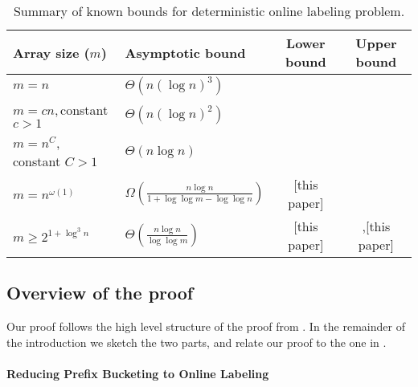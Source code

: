 \documentclass[unicode,review]{siamart1116}
\newcommand{\PTheta}[1]{\Theta\!\left(#1\right)}
\numberwithin{theorem}{section}
\begin{document}
\begin{table}
\centering
\caption{Summary of known bounds for deterministic online labeling problem.} \label{tab-1}
\begin{tabular}{l l c c}
	\toprule 
	Array size ($m$) &
	Asymptotic bound &
	Lower bound &
	Upper bound
	\\ \toprule

	$m = n$ &
	$\PTheta{n (\log n)^3}$ &
	\cite{BKS} &
	\cite{Zhang}
	\\ \midrule

	$m = cn$,\,constant $c>1$ &
	$\PTheta{n (\log n)^2}$ &
	\cite{BKS} &
	\cite{Itaietal}
	\\ \midrule

%	

	$m = n ^ {C}$,\, constant $C>1$ &
	$\PTheta{n \log n}$ &
	\cite{DSZ04} &
	\cite{Itaietal}
	\\ \midrule

	$m = n ^ {\omega(1)}$ &
	$\Omega{\left(\frac{n \log n}{1 + \log \log m - \log \log n}\right)}$ &
	[this paper] & 
\\ \midrule

	$m \geq 2^{1+\log^3 n}$ &
	$\PTheta{\frac{n \log n}{\log \log m}}$ &
	[this paper] & \cite{BKS},[this paper]
	\\ \bottomrule
\end{tabular}
\label{table:table_bounds}
\end{table}

\subsection{Overview of the proof}
\label{s-1.1}

Our proof follows the high level structure of the proof from \cite{DSZ04}.  In the remainder of the introduction we sketch the two
parts, and relate our proof to the one in \cite{DSZ04}.

\paragraph{Reducing Prefix Bucketing to Online Labeling}
\end{document}
